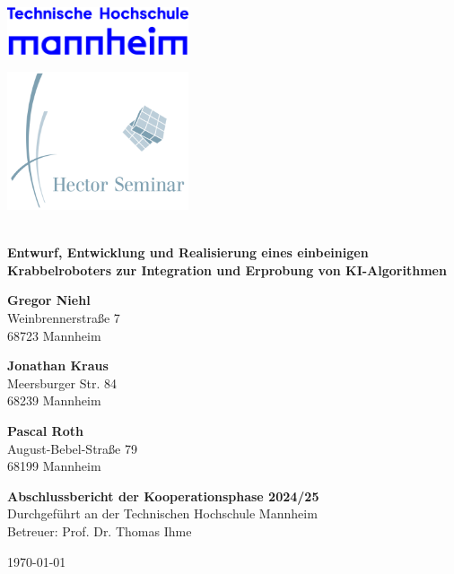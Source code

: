 \documentclass[12pt,a4paper]{article}
\begin{document}
	
	\begin{titlepage}
		\begin{minipage}[c]{0.49\textwidth}
			\raggedright
			\includegraphics[width=0.4\textwidth]{TH_Mannheim_Logo_RGB_blau.png}
		\end{minipage}
		\hfill
		\begin{minipage}[c]{0.49\textwidth}
			\raggedleft
			\includegraphics[width=0.4\textwidth]{logo.png}
		\end{minipage}
		\\[1cm]
		\centering
		\textbf{\LARGE{Entwurf, Entwicklung und Realisierung eines einbeinigen Krabbelroboters zur Integration und Erprobung von KI-Algorithmen}} \\[2cm]
		
		\vfill
			\begin{minipage}[t]{0.32\textwidth}
			    \raggedright
			    \textbf{Gregor Niehl} \\
			    Weinbrennerstraße 7 \\
			    68723 Mannheim \\
			\end{minipage}
			\hfill
			\begin{minipage}[t]{0.32\textwidth}
			    \centering
			    \textbf{Jonathan Kraus} \\
			    Meersburger Str. 84 \\
			    68239 Mannheim \\
			\end{minipage}
			\hfill
			\begin{minipage}[t]{0.32\textwidth}
			    \raggedleft
			    \textbf{Pascal Roth} \\
			    August-Bebel-Straße 79\\
			    68199 Mannheim \\
			\end{minipage}
		\vfill
		
		\textbf{Abschlussbericht der Kooperationsphase 2024/25} \\
		Durchgeführt an der Technischen Hochschule Mannheim \\
		Betreuer: Prof. Dr. Thomas Ihme \\
		\vfill
		
		\today
	\end{titlepage}
	
	\tableofcontents
	\newpage
	
	
	
	
	
	
	
\end{document}
